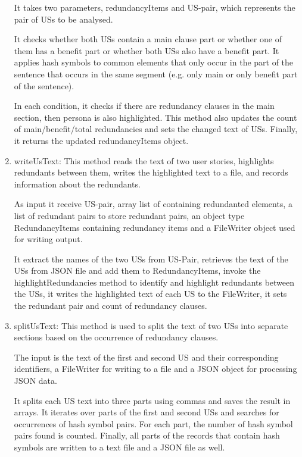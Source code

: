 \begin{enumerate}
	It takes two parameters, redundancyItems and US-pair, which represents the pair of USs to be analysed. 
	
	It checks whether both USs contain a main clause part or whether one of them has a benefit part or whether both USs also have a benefit part. It applies hash symbols to common elements that only occur in the part of the sentence that occurs in the same segment (e.g. only main or only benefit part of the sentence). 
	
	In each condition, it checks if there are redundancy clauses in the main section, then persona is also highlighted. This method also updates the count of main/benefit/total redundancies and sets the changed text of USs. Finally, it returns the updated redundancyItems object.
	
	\item writeUsText: This method reads the text of two user stories, highlights redundants between them, writes the highlighted text to a file, and records information about the redundants. 
	
	As input it receive US-pair, array list of containing redundanted elements, a list of redundant pairs to store redundant pairs, an object type RedundancyItems containing redundancy items and a FileWriter object used for writing output.
	
	It extract the names of the two USs from US-Pair, retrieves the text of the USs from JSON file and add them to RedundancyItems, invoke the highlightRedundancies method to identify and highlight redundants between the USs, it writes the highlighted text of each US to the FileWriter, it sets the redundant pair and count of redundancy clauses.
	
	\item splitUsText: This method is used to split the text of two USs into separate sections based on the occurrence of redundancy clauses. 
	
	The input is the text of the first and second US and their corresponding identifiers, a FileWriter for writing to a file and a JSON object for processing JSON data. 
	
	It splits each US text into three parts using commas and saves the result in arrays. It iterates over parts of the first and second USs and searches for occurrences of hash symbol pairs. For each part, the number of hash symbol pairs found is counted. Finally, all parts of the records that contain hash symbols are written to a text file and a JSON file as well.
	

\end{enumerate}
